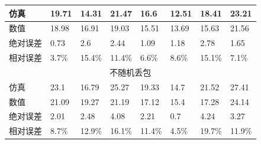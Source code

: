 \documentclass[bwprint]{gmcmthesis}
\begin{document}
\begin{table}[H]
\begin{tabular}{|llllllll|}
\multicolumn{1}{|l|}{仿真}     & \multicolumn{1}{l|}{19.71} & \multicolumn{1}{l|}{14.31}  & \multicolumn{1}{l|}{21.47}  & \multicolumn{1}{l|}{16.6}   & \multicolumn{1}{l|}{12.51} & \multicolumn{1}{l|}{18.41}  & 23.21  \\ \hline
\multicolumn{1}{|l|}{数值}     & \multicolumn{1}{l|}{18.98} & \multicolumn{1}{l|}{16.91}  & \multicolumn{1}{l|}{19.03}  & \multicolumn{1}{l|}{15.51}  & \multicolumn{1}{l|}{13.69} & \multicolumn{1}{l|}{15.63}  & 21.56  \\ \hline
\multicolumn{1}{|l|}{绝对误差}   & \multicolumn{1}{l|}{0.73}  & \multicolumn{1}{l|}{2.6}    & \multicolumn{1}{l|}{2.44}   & \multicolumn{1}{l|}{1.09}   & \multicolumn{1}{l|}{1.18}  & \multicolumn{1}{l|}{2.78}   & 1.65   \\ \hline
\multicolumn{1}{|l|}{相对误差}   & \multicolumn{1}{l|}{3.7\%} & \multicolumn{1}{l|}{15.4\%} & \multicolumn{1}{l|}{11.4\%} & \multicolumn{1}{l|}{6.6\%}  & \multicolumn{1}{l|}{8.6\%} & \multicolumn{1}{l|}{15.1\%} & 7.1\%  \\ \hline
\multicolumn{8}{|c|}{不随机丢包}                                                                                                                                                                                             \\ \hline
\multicolumn{1}{|l|}{仿真}     & \multicolumn{1}{l|}{23.1}  & \multicolumn{1}{l|}{16.79}  & \multicolumn{1}{l|}{25.27}  & \multicolumn{1}{l|}{19.33}  & \multicolumn{1}{l|}{14.7}  & \multicolumn{1}{l|}{21.52}  & 27.41  \\ \hline
\multicolumn{1}{|l|}{数值}     & \multicolumn{1}{l|}{21.09} & \multicolumn{1}{l|}{19.27}  & \multicolumn{1}{l|}{21.19}  & \multicolumn{1}{l|}{17.12}  & \multicolumn{1}{l|}{15.4}  & \multicolumn{1}{l|}{17.28}  & 24.14  \\ \hline
\multicolumn{1}{|l|}{绝对误差}   & \multicolumn{1}{l|}{2.01}  & \multicolumn{1}{l|}{2.48}   & \multicolumn{1}{l|}{4.08}   & \multicolumn{1}{l|}{2.21}   & \multicolumn{1}{l|}{0.7}   & \multicolumn{1}{l|}{4.24}   & 3.27   \\ \hline
\multicolumn{1}{|l|}{相对误差}   & \multicolumn{1}{l|}{8.7\%} & \multicolumn{1}{l|}{12.9\%} & \multicolumn{1}{l|}{16.1\%}   & \multicolumn{1}{l|}{11.4\%} & \multicolumn{1}{l|}{4.5\%} & \multicolumn{1}{l|}{19.7\%} & 11.9\% \\ \hline
\end{tabular}
\label{tab:1} 
\end{table}
\end{document}
